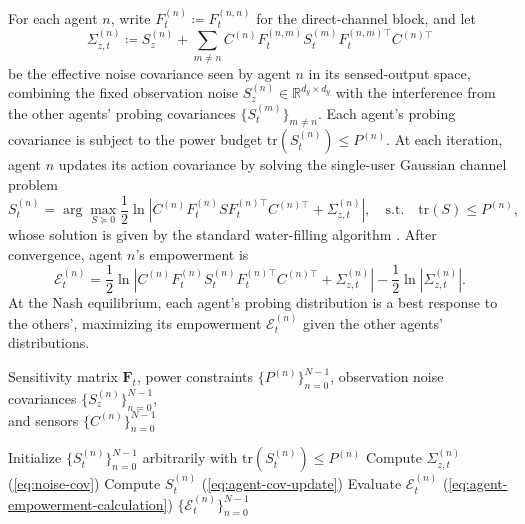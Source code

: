 \documentclass{article} %
\begin{document}
For each agent $n$, write $F_t^{(n)} \coloneq F_t^{(n,n)}$ for the direct-channel block, and let
\begin{equation}\label{eq:noise-cov}
    \Sigma_{z,t}^{(n)} \coloneq S_z^{(n)} + \sum_{m \neq n} C^{(n)} F_t^{(n,m)} S_t^{(m)} F_t^{(n,m)\top} C^{(n)\top}
\end{equation}
be the effective noise covariance seen by agent $n$ in its sensed-output space, combining the fixed observation noise $S_z^{(n)} \in \mathbb{R}^{d_y \times d_y}$ with the interference from the other agents' probing covariances $\{S_t^{(m)}\}_{m \neq n}$. Each agent's probing covariance is subject to the power budget $\mathrm{tr}(S_t^{(n)}) \leq P^{(n)}$. At each iteration, agent $n$ updates its action covariance by solving the single-user Gaussian channel problem
\begin{equation}\label{eq:agent-cov-update}
    S_t^{(n)} = \arg\max_{S \succeq 0}
    \frac{1}{2} \ln \left| C^{(n)} F_t^{(n)} S F_t^{(n)\top} C^{(n)\top} + \Sigma_{z,t}^{(n)} \right|,
    \quad \mathrm{s.t.} \quad \mathrm{tr}(S) \leq P^{(n)},
\end{equation}
whose solution is given by the standard water-filling algorithm \citep{cover1999elements}. After convergence, agent $n$'s empowerment is
\begin{equation}\label{eq:agent-empowerment-calculation}
    \mathcal{E}_t^{(n)} = \frac{1}{2} \ln \left| C^{(n)} F_t^{(n)} S_t^{(n)} F_t^{(n)\top} C^{(n)\top} + \Sigma_{z,t}^{(n)} \right| - \frac{1}{2} \ln \left| \Sigma_{z,t}^{(n)} \right|.
\end{equation}
At the Nash equilibrium, each agent's probing distribution is a best response to the others', maximizing its empowerment $\mathcal{E}_t^{(n)}$ given the other agents' distributions.

\begin{algorithm}%
\caption{Iterative Water-Filling for $N$ Agents}
\label{alg:iwf_n_agent}
\begin{algorithmic}[1]
\REQUIRE Sensitivity matrix $\mathbf{F}_t$, power constraints $\{P^{(n)}\}_{n=0}^{N-1}$, observation noise covariances $\{S_z^{(n)}\}_{n=0}^{N-1}$, \\ and sensors $\{C^{(n)}\}_{n=0}^{N-1}$

\STATE Initialize $\{S_t^{(n)}\}_{n=0}^{N-1}$ arbitrarily with $\mathrm{tr}(S_t^{(n)}) \leq P^{(n)}$
        \STATE Compute $\Sigma_{z,t}^{(n)}$ (\eqref{eq:noise-cov})
        \STATE Compute $S_t^{(n)}$ (\eqref{eq:agent-cov-update})
    \ENDFOR
\ENDWHILE
\STATE Evaluate $\mathcal{E}_t^{(n)}$ (\eqref{eq:agent-empowerment-calculation})
\RETURN $\{\mathcal{E}_t^{(n)}\}_{n=0}^{N-1}$
\end{algorithmic}
\end{algorithm}
\end{document}
